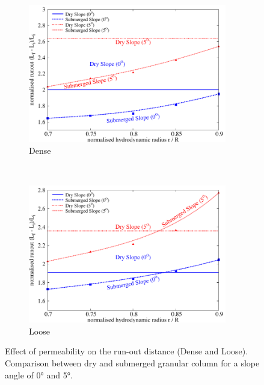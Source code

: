 \begin{figure}
	\centering
\begin{subfigure}[b]{0.95\textwidth}
	\centering
    \includegraphics[width=0.95\textwidth]{Perm_Runout_a08_dense}
    \caption{Dense}
    \label{fig:Perm_Runout_a08_dense}
\end{subfigure}\\
\begin{subfigure}[b]{0.95\textwidth}
	\centering
    \includegraphics[width=0.95\textwidth]{Perm_Runout_a08_loose}
    \caption{Loose}
    \label{fig:Perm_Runout_a08_loose}
\end{subfigure}
\caption{Effect of permeability on the run-out distance (Dense and Loose). 
	Comparison between dry and submerged granular column for a slope angle of 
    0\si{\degree} and 5\si{\degree}.}
\label{fig:Perm_Runout_loose_dense}
\end{figure}

